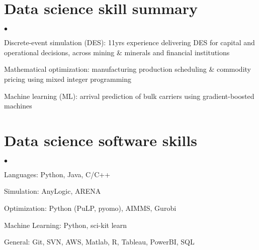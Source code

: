 \documentclass[margin,line]{resume}
\newenvironment{list2}{
  \begin{list}{$\bullet$}{%
      \setlength{\itemsep}{0in}
      \setlength{\parsep}{0in} \setlength{\parskip}{0in}
      \setlength{\topsep}{0in} \setlength{\partopsep}{0in}
      \setlength{\leftmargin}{0.2in}}}{\end{list}}
\begin{document}
\begin{resume}
\section{\sc Data science skill summary}
\begin{list2}
\item Discrete-event simulation (DES): 11yrs experience delivering DES for capital and operational decisions, across mining \& minerals and financial institutions
\item Mathematical optimization: manufacturing production scheduling \& commodity pricing using mixed integer programming
\item Machine learning (ML): arrival prediction of bulk carriers using gradient-boosted machines
\end{list2}

\section{\sc Data science software skills}
\begin{list2}
\item Languages: Python, Java, C/C++
\item Simulation: AnyLogic, ARENA
\item Optimization: Python (PuLP, pyomo), AIMMS, Gurobi
\item Machine Learning: Python, sci-kit learn
\item General: Git, SVN, AWS, Matlab, R, Tableau, PowerBI, SQL
\end{list2}


\end{resume}
\end{document}
